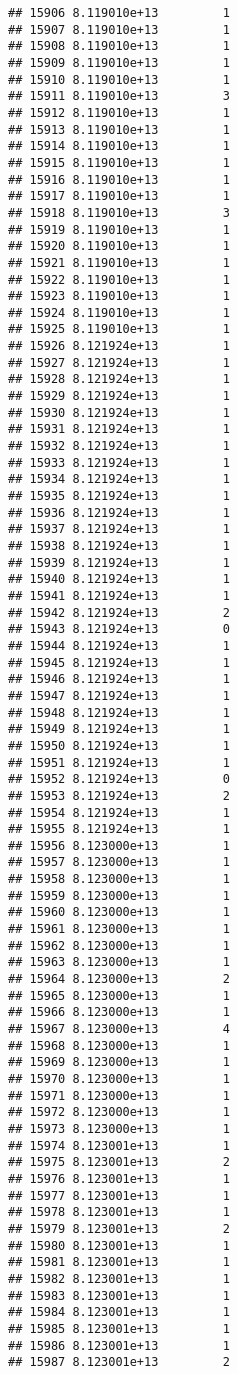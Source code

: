 \documentclass[
]{article}
\begin{document}
\begin{verbatim}
## 15906 8.119010e+13         1
## 15907 8.119010e+13         1
## 15908 8.119010e+13         1
## 15909 8.119010e+13         1
## 15910 8.119010e+13         1
## 15911 8.119010e+13         3
## 15912 8.119010e+13         1
## 15913 8.119010e+13         1
## 15914 8.119010e+13         1
## 15915 8.119010e+13         1
## 15916 8.119010e+13         1
## 15917 8.119010e+13         1
## 15918 8.119010e+13         3
## 15919 8.119010e+13         1
## 15920 8.119010e+13         1
## 15921 8.119010e+13         1
## 15922 8.119010e+13         1
## 15923 8.119010e+13         1
## 15924 8.119010e+13         1
## 15925 8.119010e+13         1
## 15926 8.121924e+13         1
## 15927 8.121924e+13         1
## 15928 8.121924e+13         1
## 15929 8.121924e+13         1
## 15930 8.121924e+13         1
## 15931 8.121924e+13         1
## 15932 8.121924e+13         1
## 15933 8.121924e+13         1
## 15934 8.121924e+13         1
## 15935 8.121924e+13         1
## 15936 8.121924e+13         1
## 15937 8.121924e+13         1
## 15938 8.121924e+13         1
## 15939 8.121924e+13         1
## 15940 8.121924e+13         1
## 15941 8.121924e+13         1
## 15942 8.121924e+13         2
## 15943 8.121924e+13         0
## 15944 8.121924e+13         1
## 15945 8.121924e+13         1
## 15946 8.121924e+13         1
## 15947 8.121924e+13         1
## 15948 8.121924e+13         1
## 15949 8.121924e+13         1
## 15950 8.121924e+13         1
## 15951 8.121924e+13         1
## 15952 8.121924e+13         0
## 15953 8.121924e+13         2
## 15954 8.121924e+13         1
## 15955 8.121924e+13         1
## 15956 8.123000e+13         1
## 15957 8.123000e+13         1
## 15958 8.123000e+13         1
## 15959 8.123000e+13         1
## 15960 8.123000e+13         1
## 15961 8.123000e+13         1
## 15962 8.123000e+13         1
## 15963 8.123000e+13         1
## 15964 8.123000e+13         2
## 15965 8.123000e+13         1
## 15966 8.123000e+13         1
## 15967 8.123000e+13         4
## 15968 8.123000e+13         1
## 15969 8.123000e+13         1
## 15970 8.123000e+13         1
## 15971 8.123000e+13         1
## 15972 8.123000e+13         1
## 15973 8.123000e+13         1
## 15974 8.123001e+13         1
## 15975 8.123001e+13         2
## 15976 8.123001e+13         1
## 15977 8.123001e+13         1
## 15978 8.123001e+13         1
## 15979 8.123001e+13         2
## 15980 8.123001e+13         1
## 15981 8.123001e+13         1
## 15982 8.123001e+13         1
## 15983 8.123001e+13         1
## 15984 8.123001e+13         1
## 15985 8.123001e+13         1
## 15986 8.123001e+13         1
## 15987 8.123001e+13         2

\end{verbatim}
\end{document}
